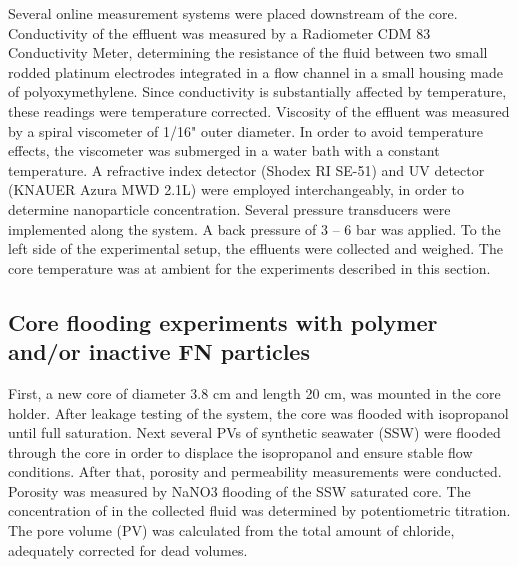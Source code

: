 \begin{figure}[hp]
\end{figure}

Several online measurement systems were placed downstream of the core. Conductivity of the effluent was measured by a Radiometer CDM 83 Conductivity Meter, determining the resistance of the fluid between two small rodded platinum electrodes integrated in a flow channel in a small housing made of polyoxymethylene. Since conductivity is substantially affected by temperature, these readings were temperature corrected. Viscosity of the effluent was measured by a spiral viscometer of 1/16" outer diameter. In order to avoid temperature effects, the viscometer was submerged in a water bath with a constant temperature. A refractive index detector (Shodex RI SE-51) and UV detector (KNAUER Azura MWD 2.1L) were employed interchangeably, in order to determine nanoparticle concentration. Several pressure transducers were implemented along the system. A back pressure of 3 – 6 bar was applied. To the left side of the experimental setup, the effluents were collected and weighed. The core temperature was at ambient for the experiments described in this section.

\subsection{Core flooding experiments with polymer and/or inactive FN particles}

First, a new core of diameter 3.8 cm and length 20 cm, was mounted in the core holder. After leakage testing of the system, the core was flooded with isopropanol until full saturation. Next several PVs of synthetic seawater (SSW) were flooded through the core in order to displace the isopropanol and ensure stable flow conditions. After that, porosity and permeability measurements were conducted. Porosity was measured by NaNO3 flooding of the SSW saturated core. The concentration of  in the collected fluid was determined by potentiometric titration. The pore volume (PV) was calculated from the total amount of chloride, adequately corrected for dead volumes.

